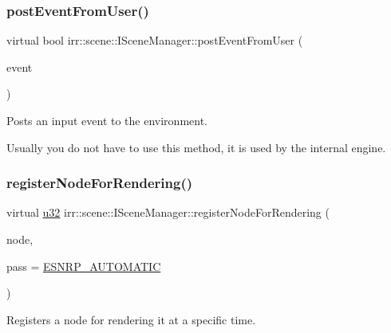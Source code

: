 \subsubsection{\texorpdfstring{post\+Event\+From\+User()}{postEventFromUser()}}
{\footnotesize\ttfamily virtual bool irr\+::scene\+::\+I\+Scene\+Manager\+::post\+Event\+From\+User (\begin{DoxyParamCaption}\item[{const \hyperlink{structirr_1_1SEvent}{S\+Event} \&}]{event }\end{DoxyParamCaption})\hspace{0.3cm}{\ttfamily [pure virtual]}}



Posts an input event to the environment. 

Usually you do not have to use this method, it is used by the internal engine. \mbox{\label{classirr_1_1scene_1_1ISceneManager_aaf17bdde6d4e9ef61a76f3b43100ecb8}} 
\subsubsection{\texorpdfstring{register\+Node\+For\+Rendering()}{registerNodeForRendering()}}
{\footnotesize\ttfamily virtual \hyperlink{namespaceirr_a0416a53257075833e7002efd0a18e804}{u32} irr\+::scene\+::\+I\+Scene\+Manager\+::register\+Node\+For\+Rendering (\begin{DoxyParamCaption}\item[{\hyperlink{classirr_1_1scene_1_1ISceneNode}{I\+Scene\+Node} $\ast$}]{node,  }\item[{\hyperlink{namespaceirr_1_1scene_a7862269bd1abc123929d4dbb8200d67f}{E\+\_\+\+S\+C\+E\+N\+E\+\_\+\+N\+O\+D\+E\+\_\+\+R\+E\+N\+D\+E\+R\+\_\+\+P\+A\+SS}}]{pass = {\ttfamily \hyperlink{namespaceirr_1_1scene_a7862269bd1abc123929d4dbb8200d67fa5ceee6e4bc2fab42c663b32018e276e8}{E\+S\+N\+R\+P\+\_\+\+A\+U\+T\+O\+M\+A\+T\+IC}} }\end{DoxyParamCaption})\hspace{0.3cm}{\ttfamily [pure virtual]}}



Registers a node for rendering it at a specific time. 

